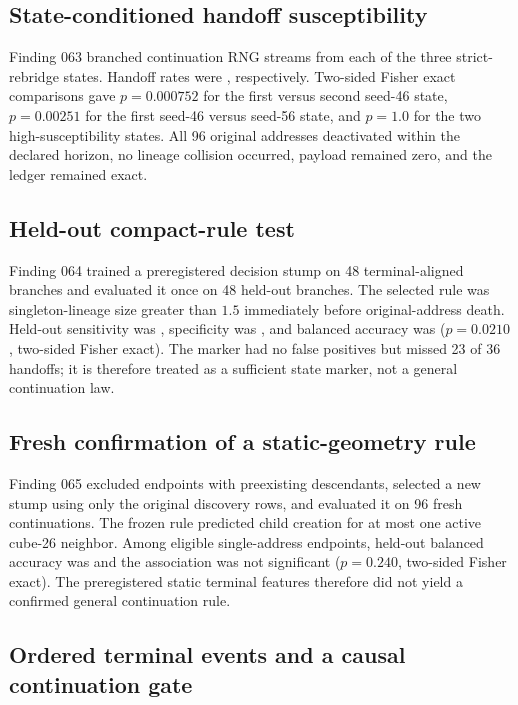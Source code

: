 \subsection{State-conditioned handoff susceptibility}

Finding 063 branched \GCFourBranches{} continuation RNG streams from each of the
three strict-rebridge states. Handoff rates were \GCFourRates{}, respectively.
Two-sided Fisher exact comparisons gave $p=0.000752$ for the first versus second
seed-46 state, $p=0.00251$ for the first seed-46 versus seed-56 state, and
$p=1.0$ for the two high-susceptibility states. All 96 original addresses
deactivated within the declared horizon, no lineage collision occurred, payload
remained zero, and the ledger remained exact.

\subsection{Held-out compact-rule test}

Finding 064 trained a preregistered decision stump on 48 terminal-aligned
branches and evaluated it once on 48 held-out branches. The selected rule was
singleton-lineage size greater than $1.5$ immediately before original-address
death. Held-out sensitivity was \GCFiveSensitivity{}, specificity was
\GCFiveSpecificity{}, and balanced accuracy was \GCFiveBalancedAccuracy{}
($p=0.0210$, two-sided Fisher exact). The marker had no false positives but
missed 23 of 36 handoffs; it is therefore treated as a sufficient state marker,
not a general continuation law.

\subsection{Fresh confirmation of a static-geometry rule}

Finding 065 excluded endpoints with preexisting descendants, selected a new
stump using only the original discovery rows, and evaluated it on 96 fresh
continuations. The frozen rule predicted child creation for at most one active
cube-26 neighbor. Among \GCSixEligibleRows{} eligible single-address endpoints,
held-out balanced accuracy was \GCSixBalancedAccuracy{} and the association was
not significant ($p=0.240$, two-sided Fisher exact). The preregistered static
terminal features therefore did not yield a confirmed general continuation
rule.

\subsection{Ordered terminal events and a causal continuation gate}

